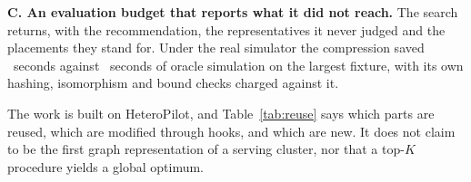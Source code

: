 \textbf{C. An evaluation budget that reports what it did not reach.} The search
returns, with the recommendation, the representatives it never judged and the
placements they stand for. Under the real simulator the compression saved
\egthreeSavingAbcde~seconds against \egthreeSimOracleAbcde~seconds of oracle
simulation on the largest fixture, with its own hashing, isomorphism and bound
checks charged against it.

The work is built on HeteroPilot, and Table~\ref{tab:reuse} says which
parts are reused, which are modified through hooks, and which are new. It does
not claim to be the first graph representation of a serving cluster, nor that
a top-$K$ procedure yields a global optimum.
